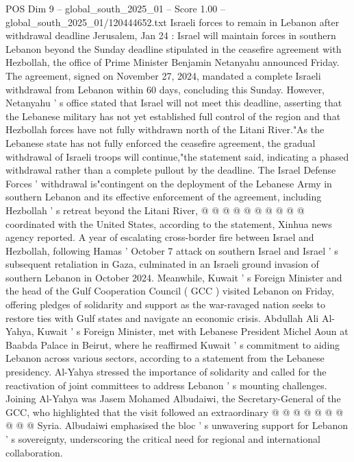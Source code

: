 \begin{textsample}{POS Dim 9 – global\_south\_2025\_01 – Score 1.00 – global\_south\_2025\_01/120444652.txt}  \label{ex:f9_pos_314}
Israeli forces to remain in Lebanon after withdrawal deadline Jerusalem, Jan 24 : Israel will maintain forces in southern Lebanon beyond the Sunday deadline stipulated in the ceasefire agreement with Hezbollah, the office of Prime Minister Benjamin Netanyahu announced Friday.
The agreement, signed on November 27, 2024, mandated a complete Israeli withdrawal from Lebanon within 60 days, concluding this Sunday.
However, Netanyahu ' s office stated that Israel will not meet this deadline, asserting that the Lebanese military has not yet established full control of the region and that Hezbollah forces have not fully withdrawn north of the Litani River."As the Lebanese state has not fully enforced the ceasefire agreement, the gradual withdrawal of Israeli troops will continue,"the statement said, indicating a phased withdrawal rather than a complete pullout by the deadline.
The Israel Defense Forces ' withdrawal is"contingent on the deployment of the Lebanese Army in southern Lebanon and its effective enforcement of the agreement, including Hezbollah ' s retreat beyond the Litani River, @ @ @ @ @ @ @ @ @ @ coordinated with the United States, according to the statement, Xinhua news agency reported.
A year of escalating cross-border fire between Israel and Hezbollah, following Hamas ' October 7 attack on southern Israel and Israel ' s subsequent retaliation in Gaza, culminated in an Israeli ground invasion of southern Lebanon in October 2024.
Meanwhile, Kuwait ' s Foreign Minister and the head of the Gulf Cooperation Council ( GCC ) visited Lebanon on Friday, offering pledges of solidarity and support as the war-ravaged nation seeks to restore ties with Gulf states and navigate an economic crisis.
Abdullah Ali Al-Yahya, Kuwait ' s Foreign Minister, met with Lebanese President Michel Aoun at Baabda Palace in Beirut, where he reaffirmed Kuwait ' s commitment to aiding Lebanon across various sectors, according to a statement from the Lebanese presidency.
Al-Yahya stressed the importance of solidarity and called for the reactivation of joint committees to address Lebanon ' s mounting challenges.
Joining Al-Yahya was Jasem Mohamed Albudaiwi, the Secretary-General of the GCC, who highlighted that the visit followed an extraordinary @ @ @ @ @ @ @ @ @ @ Syria.
Albudaiwi emphasised the bloc ' s unwavering support for Lebanon ' s sovereignty, underscoring the critical need for regional and international collaboration.

\end{textsample}
